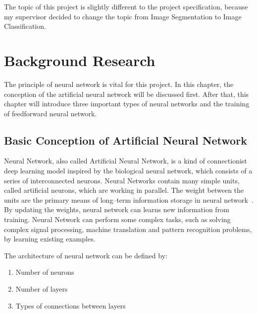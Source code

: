 \documentclass[]{UCD_CS_FYP_Report}
\begin{document}
The topic of this project is slightly different to the project specification, because my supervisor decided to change the topic from Image Segmentation to Image Classification. 


\chapter{\label{chapter2}Background Research}
The principle of neural network is vital for this project. In this chapter, the conception of the artificial neural network will be discussed first. After that, this chapter will introduce three important types of neural networks and the training of feedforward neural network.
\section{Basic Conception of Artificial Neural Network}
Neural Network, also called Artificial Neural Network, is a kind of connectionist deep learning model inspired by the biological neural network, which consists of a series of interconnected neurons. Neural Networks contain many simple units, called artificial neurons, which are working in parallel. The weight between the units are the primary means of long–term information storage in neural network~\cite{Gibson:2017}. By updating the weights, neural network can learns new information from training. Neural Network can perform some complex tasks, such as solving complex signal processing, machine translation and pattern recognition problems, by learning existing examples.

The architecture of neural network can be defined by:
\begin{enumerate}
\item Number of neurons
\item Number of layers
\item Types of connections between layers~\cite{Gibson:2017} 
\end{enumerate}
\end{document}
